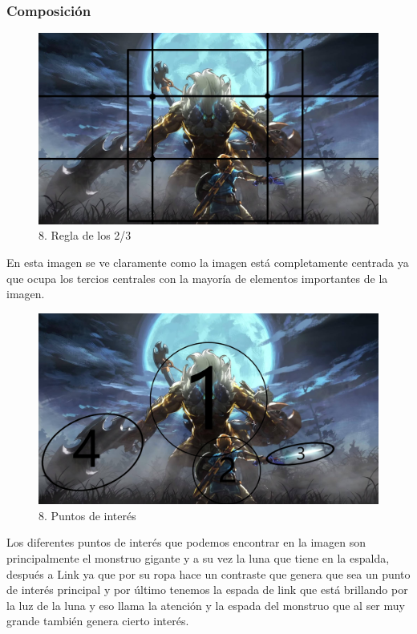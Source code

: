 \documentclass[12pt]{article}
\begin{document}
        \subsubsection{Composición}

\begin{figure}[H]
      \centering
      \includegraphics[scale=0.25]{images/Raúl/Sección 8/Imagen 8 2 3.jpg}
      \caption{\small 8. Regla de los 2/3}
    \end{figure}

En esta imagen se ve claramente como la imagen está completamente centrada ya que ocupa los tercios centrales con la mayoría de elementos importantes de la imagen.

\begin{figure}[H]
      \centering
      \includegraphics[scale=0.25]{images/Raúl/Sección 8/Imagen 8 p. interes.jpg}
      \caption{\small 8. Puntos de interés}
    \end{figure}

Los diferentes puntos de interés que podemos encontrar en la imagen son principalmente el monstruo gigante y a su vez la luna que tiene en la espalda, después a Link ya que por su ropa hace un contraste que genera que sea un punto de interés principal y por último tenemos la espada de link que está brillando por la luz de la luna y eso llama la atención y la espada del monstruo que al ser muy grande también genera cierto interés.
\end{document}
